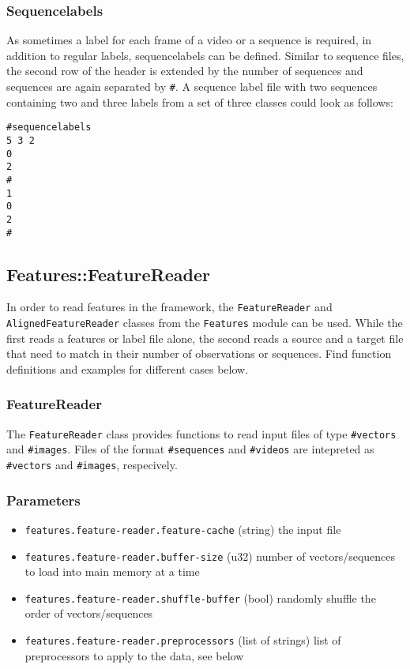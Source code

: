 \subsubsection*{Sequencelabels}

As sometimes a label for each frame of a video or a sequence is required, in addition to regular labels, sequencelabels can be defined. Similar to sequence files, the second row of the header is extended by the number of sequences and sequences are again separated by \texttt{\#}. A sequence label file with two sequences containing two and three labels from a set of three classes could look as follows:
\begin{verbatim}
#sequencelabels
5 3 2
0
2
#
1
0
2
#
\end{verbatim}


\subsection{Features::FeatureReader}


In order to read features in the framework, the \texttt{FeatureReader} and \texttt{AlignedFeatureReader} classes from the \texttt{Features} module can be used. While the first reads a features or label file alone, the second reads a source and a target file that need to match in their number of observations or sequences. Find function definitions and examples for different cases below.

\subsubsection{FeatureReader}

The \texttt{FeatureReader} class provides functions to read input files of type \texttt{\#vectors} and \texttt{\#images}. Files of the format \texttt{\#sequences} and \texttt{\#videos} are intepreted as \texttt{\#vectors} and \texttt{\#images}, respecively.

\subsubsection*{Parameters}

\begin{itemize}
    \item \texttt{features.feature-reader.feature-cache} (string) the input file
    \item \texttt{features.feature-reader.buffer-size} (u32) number of vectors/sequences to load into main memory at a time
    \item \texttt{features.feature-reader.shuffle-buffer} (bool) randomly shuffle the order of vectors/sequences
    \item \texttt{features.feature-reader.preprocessors} (list of strings) list of preprocessors to apply to the data, see below
\end{itemize}

